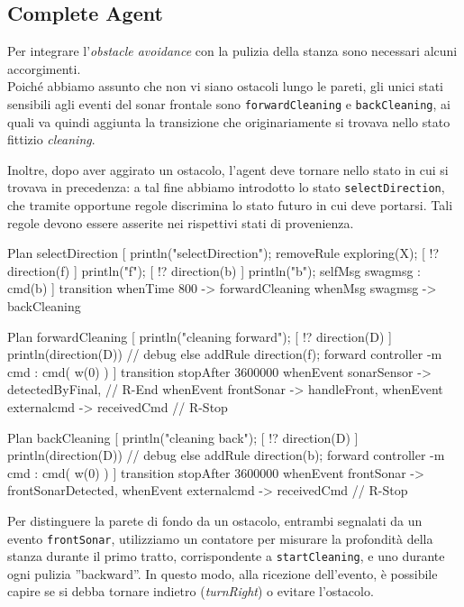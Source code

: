 \documentclass{../llncs}
\newcommand{\codescript}[1]{{\mbox{\small{\texttt{#1}}}}\xspace}
\begin{document}
\subsection{Complete Agent}
Per integrare l'\emph{obstacle avoidance} con la pulizia della stanza sono necessari alcuni accorgimenti.\\

Poiché abbiamo assunto che non vi siano ostacoli lungo le pareti, gli unici stati sensibili agli eventi del sonar frontale sono \codescript{forwardCleaning} e \codescript{backCleaning}, ai quali va quindi aggiunta la transizione che originariamente si trovava nello stato fittizio \emph{cleaning}.

Inoltre, dopo aver aggirato un ostacolo, l'agent deve tornare nello stato in cui si trovava in precedenza: a tal fine abbiamo introdotto lo stato \codescript{selectDirection}, che tramite opportune regole discrimina lo stato futuro in cui deve portarsi. Tali regole devono essere asserite nei rispettivi stati di provenienza.\\

\begin{qacode}[caption={SoftwareAgent, pt10}]
Plan selectDirection [
	println("selectDirection");
	removeRule exploring(X);
	[ !? direction(f) ] println("f");
	[ !? direction(b) ] { println("b"); selfMsg swagmsg : cmd(b) }
]
transition
	whenTime 800 -> forwardCleaning
	whenMsg swagmsg -> backCleaning
	
Plan forwardCleaning [
	println("cleaning forward");
	[ !? direction(D) ]
		println(direction(D)) // debug
	else
		addRule direction(f);
	forward controller -m cmd : cmd( w(0) )
]
transition stopAfter 3600000
	whenEvent sonarSensor -> detectedByFinal, // R-End
	whenEvent frontSonar -> handleFront,
	whenEvent externalcmd -> receivedCmd // R-Stop

Plan backCleaning [
	println("cleaning back");
	[ !? direction(D) ]
		println(direction(D)) // debug
	else
		addRule direction(b);
	forward controller -m cmd : cmd( w(0) )
]
transition stopAfter 3600000
	whenEvent frontSonar -> frontSonarDetected,
	whenEvent externalcmd -> receivedCmd // R-Stop
\end{qacode}

Per distinguere la parete di fondo da un ostacolo, entrambi segnalati da un evento \codescript{frontSonar}, utilizziamo un contatore per misurare la profondità della stanza durante il primo tratto, corrispondente a \codescript{startCleaning}, e uno durante ogni pulizia ''backward''. In questo modo, alla ricezione dell'evento, è possibile capire se si debba tornare indietro (\emph{turnRight}) o evitare l'ostacolo.\\
\end{document}
